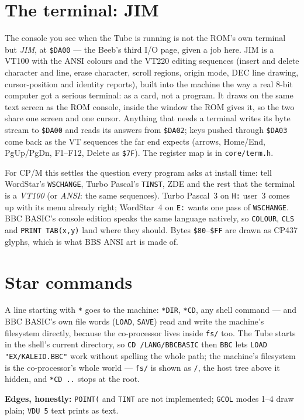 \section{The terminal: JIM}
The console you see when the Tube is running is not the ROM's own terminal
but \emph{JIM}, at \texttt{\$DA00} --- the Beeb's third I/O page, given a
job here. JIM is a VT100 with the ANSI colours and the VT220 editing
sequences (insert and delete character and line, erase character, scroll
regions, origin mode, DEC line drawing, cursor-position and identity
reports), built into the machine the way a real 8-bit computer got a
serious terminal: as a card, not a program. It draws on the same text
screen as the ROM console, inside the window the ROM gives it, so the two
share one screen and one cursor. Anything that needs a terminal writes its
byte stream to \texttt{\$DA00} and reads its answers from \texttt{\$DA02};
keys pushed through \texttt{\$DA03} come back as the VT sequences the far
end expects (arrows, Home/End, PgUp/PgDn, F1--F12, Delete as \texttt{\$7F}).
The register map is in \texttt{core/term.h}.


For CP/M this settles the question every program asks at install time:
tell WordStar's \texttt{WSCHANGE}, Turbo Pascal's \texttt{TINST}, ZDE and
the rest that the terminal is a \emph{VT100} (or \emph{ANSI}: the same
sequences). Turbo Pascal~3 on \texttt{H:} user~3 comes up with its menu
already right; WordStar~4 on \texttt{E:} wants one pass of
\texttt{WSCHANGE}. BBC BASIC's console edition speaks the same language
natively, so \verb|COLOUR|, \verb|CLS| and \verb|PRINT TAB(x,y)| land
where they should. Bytes \texttt{\$80}--\texttt{\$FF} are drawn as CP437
glyphs, which is what BBS ANSI art is made of.

\section{Star commands}
A line starting with \verb|*| goes to the machine: \verb|*DIR|, \verb|*CD|,
any shell command --- and BBC BASIC's own file words (\verb|LOAD|,
\verb|SAVE|) read and write the machine's filesystem directly, because the
co-processor lives inside \texttt{fs/} too. The Tube starts in the shell's
current directory, so \verb|CD /LANG/BBCBASIC| then \verb|BBC| lets
\verb|LOAD "EX/KALEID.BBC"| work without spelling the whole path; the machine's
filesystem is the co-processor's whole world --- \texttt{fs/} is shown as
\texttt{/}, the host tree above it hidden, and \verb|*CD ..| stops at the
root.

\begin{aside}
\textbf{Edges, honestly:} \texttt{POINT(} and \texttt{TINT} are not
implemented; \texttt{GCOL} modes 1--4 draw plain; \texttt{VDU 5} text
prints as text.
\end{aside}
